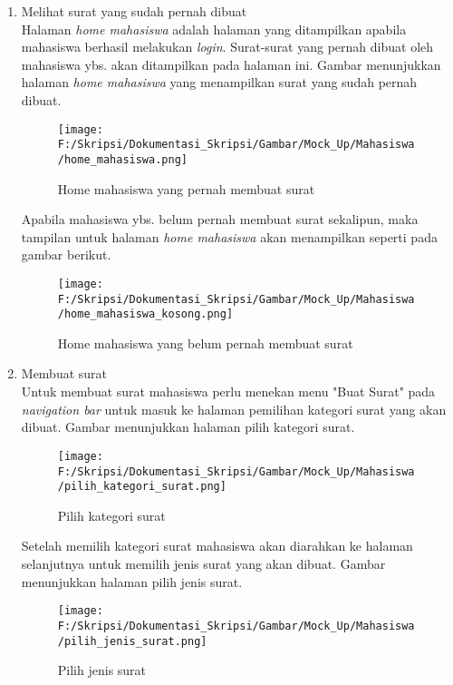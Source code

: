 \begin{enumerate}
	\item Melihat surat yang sudah pernah dibuat\\
	Halaman \textit{home mahasiswa} adalah halaman yang ditampilkan apabila mahasiswa berhasil melakukan \textit{login}. Surat-surat yang pernah dibuat oleh mahasiswa ybs. akan ditampilkan pada halaman ini. Gambar menunjukkan halaman \textit{home mahasiswa} yang menampilkan surat yang sudah pernah dibuat.

	\begin{figure}[H]
	\centering
		\texttt{[image: F:/Skripsi/Dokumentasi\_Skripsi/Gambar/Mock\_Up/Mahasiswa/home\_mahasiswa.png]}
		\caption{Home mahasiswa yang pernah membuat surat}
		\label{fig:home_mahasiswa_yang_pernah_membuat_surat}
	\end{figure}
	
	Apabila mahasiswa ybs. belum pernah membuat surat sekalipun, maka tampilan untuk halaman \textit{home mahasiswa} akan menampilkan seperti pada gambar berikut.
	\begin{figure}[H]
	\centering
		\texttt{[image: F:/Skripsi/Dokumentasi\_Skripsi/Gambar/Mock\_Up/Mahasiswa/home\_mahasiswa\_kosong.png]}
		\caption{Home mahasiswa yang belum pernah membuat surat}
		\label{fig:home_mahasiswa_yang_belum_pernah_membuat_surat}
	\end{figure}
	
	\item Membuat surat\\
	Untuk membuat surat mahasiswa perlu menekan menu "Buat Surat" pada \textit{navigation bar} untuk masuk ke halaman pemilihan kategori surat yang akan dibuat. Gambar menunjukkan halaman pilih kategori surat.
	\begin{figure}[H]
	\centering
		\texttt{[image: F:/Skripsi/Dokumentasi\_Skripsi/Gambar/Mock\_Up/Mahasiswa/pilih\_kategori\_surat.png]}
		\caption{Pilih kategori surat}
		\label{fig:pilih_kategori_surat}
	\end{figure}
	
	Setelah memilih kategori surat mahasiswa akan diarahkan ke halaman selanjutnya untuk memilih jenis surat yang akan dibuat. Gambar menunjukkan halaman pilih jenis surat.
	\begin{figure}[H]
	\centering
		\texttt{[image: F:/Skripsi/Dokumentasi\_Skripsi/Gambar/Mock\_Up/Mahasiswa/pilih\_jenis\_surat.png]}
		\caption{Pilih jenis surat}
		\label{fig:pilih_jenis_surat}
	\end{figure}
	

\end{enumerate}
